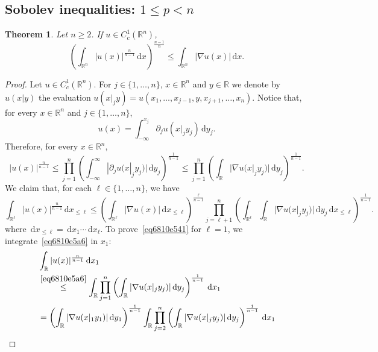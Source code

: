 \documentclass[a4paper,9pt]{amsart}
\newcommand{\R}{\mathbb{R}}	%
\newcommand{\did}{\,\mathrm{d}}	%
\newcommand{\de}{\partial}		%
\newcommand{\grad}{\nabla}
\theoremstyle{plain}
\newtheorem{theorem}[proposition]{Theorem}
\theoremstyle{definition}
\theoremstyle{remark}
\begin{document}
\subsection{Sobolev inequalities: $1\le p < n$}\label{subs6895bd5e}

\begin{theorem}\label{thm681085c3}
	Let $n\ge2$.
	If $u\in C^1_c(\R^n)$, 
	\begin{equation}\label{eq681085c8}
		\left( \int_{\R^n} |u(x)|^{\frac{n}{n-1}} \did x \right)^{\frac{n-1}{n}}
		\le \int_{\R^n} |\grad u(x)| \did x .
	\end{equation}
\end{theorem}
\begin{proof}
	Let $u\in C^1_c(\R^n)$.
	For $j\in\{1,\dots,n\}$, $x\in\R^n$ and $y\in\R$ we denote by $u(x|y)$ the evaluation
	$u(x|_jy) = u(x_1,\dots,x_{j-1},y,x_{j+1},\dots,x_n)$.
	Notice that, for every $x\in\R^n$ and $j\in\{1,\dots,n\}$,
	\begin{equation}
		u(x) = \int_{-\infty}^{x_j} \de_ju(x|_jy_j) \did y_j .
	\end{equation}
	Therefore, for every $x\in\R^n$,
	\begin{equation}\label{eq6810e5a6}
		|u(x)|^{\frac{n}{n-1}} 
		\le \prod_{j=1}^n \left( \int_{-\infty}^{\infty} |\de_ju(x|_jy_j)| \did y_j \right)^{\frac1{n-1}} 
		\le \prod_{j=1}^n \left( \int_{\R} |\grad u(x|_jy_j)| \did y_j \right)^{\frac1{n-1}} .
	\end{equation}
	We claim that, for each $\ell\in\{1,\dots,n\}$, we have
	\begin{equation}\label{eq6810e541}
		\int_{\R^\ell} |u(x)|^{\frac{n}{n-1}}  \did x_{\le \ell}
		\le \left( \int_{\R^\ell} |\grad u(x)| \did x_{\le \ell} \right)^{\frac{\ell}{n-1}} 
		 \prod_{j=\ell+1}^n \left( \int_{\R^\ell} \int_\R |\grad u(x|_jy_j)| \did y_j \did x_{\le \ell}\right)^{\frac{1}{n-1}} .
	\end{equation}
	where $\did x_{\le \ell} = \did x_1\cdots\did x_\ell$.
	To prove~\eqref{eq6810e541} for $\ell=1$, we integrate~\eqref{eq6810e5a6} in $x_1$:
	\begin{align}
		&\int_\R |u(x)|^{\frac{n}{n-1}} \did x_1 \\
		&\overset{\eqref{eq6810e5a6}}\le \int_\R \prod_{j=1}^n \left( \int_{\R} |\grad u(x|_jy_j)| \did y_j \right)^{\frac1{n-1}} \did x_1 \\
		&= \left( \int_{\R} |\grad u(x|_1y_1)| \did y_1 \right)^{\frac1{n-1}}
			\int_\R \prod_{j=2}^n \left( \int_{\R} |\grad u(x|_jy_j)| \did y_j \right)^{\frac1{n-1}} \did x_1 \\

\end{align}
\end{proof}
\end{document}

